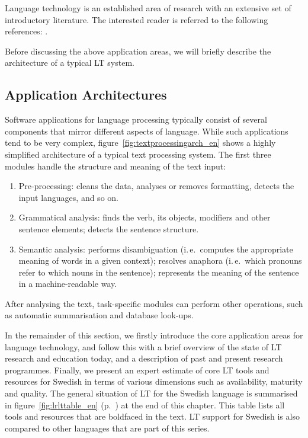 \begin{multicols}{2}
Language technology is an established area of research with an
extensive set of introductory literature. The interested reader is
referred to the following references: \cite{jurafsky-martin01,
  manning-schuetze1, lt-world1, lt-survey1}.

Before discussing the above application areas, we will briefly describe the architecture of a typical LT system.

\subsection{Application Architectures}

Software applications for language processing typically consist of
several components that mirror different aspects of language. While
such applications tend to be very complex, figure~\ref{fig:textprocessingarch_en} shows a highly simplified architecture of a typical text processing system. The first three modules handle the structure and meaning of the text input:

\begin{enumerate}
\item Pre-processing: cleans the data, analyses or removes formatting, detects the input languages, and so on.
\item Grammatical analysis: finds the verb, its objects, modifiers and
  other sentence elements; detects the sentence structure.
\item Semantic analysis: performs disambiguation (i.\,e.~computes the appropriate meaning of words in a given context); resolves anaphora (i.\,e.~which pronouns refer to which nouns in the sentence); represents the meaning of the sentence in a machine-readable way.
\end{enumerate}

After analysing the text, task-specific modules can perform other operations, such as automatic summarisation and database look-ups.

In the remainder of this section, we firstly introduce the core application areas for language technology, and follow this with a brief overview of the state of LT research and education today, and a description of past and present research programmes. Finally, we present an expert estimate of core LT tools and resources for Swedish in terms of various dimensions such as availability, maturity and quality. The general situation of LT for the Swedish language is summarised in figure~\ref{fig:lrlttable_en} (p.~\pageref{fig:lrlttable_en}) at the end of this chapter. This table lists all tools and resources that are boldfaced in the text. LT support for Swedish is also compared to other languages that are part of this series.



\end{multicols}
